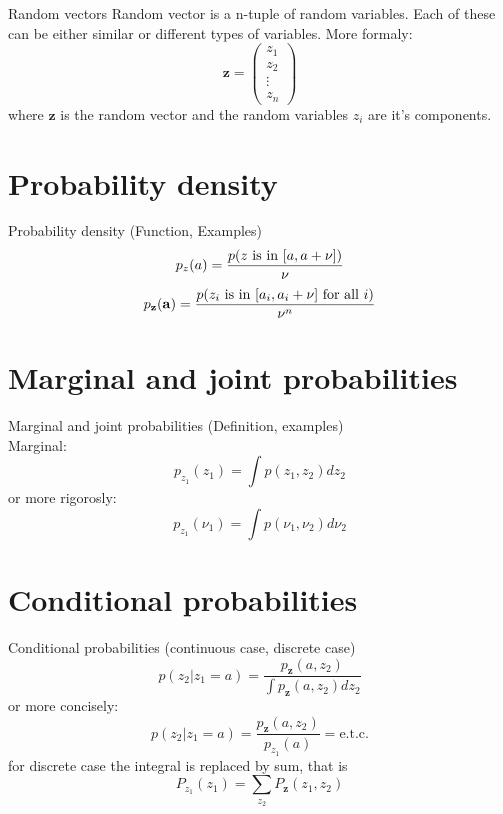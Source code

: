 \documentclass{beamer}
\begin{document}
\begin{frame}{Random vectors}
  Random vector is a n-tuple of random variables. Each of these can be either
  similar or different types of variables. More formaly:
  \[ \mathbf{z} =  \begin{pmatrix} z_1 \\ z_2 \\ \vdots \\ z_n \end{pmatrix} \]
  where $\mathbf{z}$ is the random vector and the random variables $z_i$ are
  it's components.
\end{frame}

\section{Probability density}

\begin{frame}{Probability density}
  (Function, Examples)
  \[ p_z(a) = \frac{p(\textnormal{$z$ is in $[a, a + \nu]$})}{\nu}\]
  \[ p_{\mathbf{z}}(\mathbf{a}) =
  \frac{p(\textnormal{$z_i$ is in $[a_i, a_i + \nu]$ for all $i$})}{\nu^n}\]
\end{frame}

\section{Marginal and joint probabilities}

\begin{frame}{Marginal and joint probabilities}
  (Definition, examples)\\
  Marginal:
  \[ p_{z_1}(z_1) =  \int p(z_1, z_2)dz_2\]
  or more rigorosly:
  \[ p_{z_1}(\nu_1) =  \int p(\nu_1, \nu_2)d\nu_2\]
\end{frame}

\section{Conditional probabilities}

\begin{frame}{Conditional probabilities}
  (continuous case, discrete case)
  \[
  p(z_2|z_1 = a) =
  \frac{ p_{\mathbf{z}}(a, z_2)}{\int p_{\mathbf{z}}(a, z_2)dz_2}
  \]
  or more concisely:
  \[
  p(z_2|z_1 = a) =
  \frac{ p_{\mathbf{z}}(a, z_2)}{p_{z_1}(a)} = \text{e.t.c.}
  \]
  for discrete case the integral is replaced by sum, that is
  \[ P_{z_1}(z_1) = \sum_{z_2}P_{\mathbf{z}}(z_1, z_2)\]
\end{frame}
\end{document}
